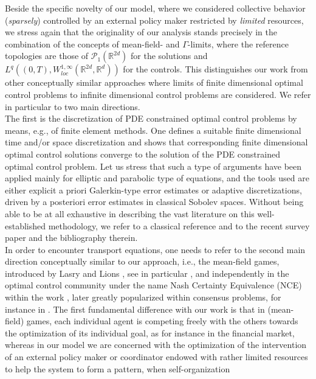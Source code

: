\documentclass[11pt]{article}
\theoremstyle{plain}
\theoremstyle{definition}
\theoremstyle{remark}
\numberwithin{equation}{section}
\begin{document}
Beside the specific novelty of our model, where we considered collective behavior ({\it sparsely}) controlled by an external policy maker restricted by {\it limited} resources, we stress again that the originality  of our analysis stands precisely in the combination of the concepts of mean-field- and $\Gamma$-limits, where the reference topologies
are those of $ \mathcal P_1(\mathbb R^{2d})$ for the solutions and $L^q((0,T),W^{1,\infty}_{loc}(\mathbb R^{2d},\mathbb R^d))$  for the controls. This distinguishes our work from other
conceptually similar approaches where limits of finite dimensional optimal control problems to infinite dimensional control problems are considered.
We refer in particular to two main directions. \\
The first is the discretization of PDE constrained optimal control problems by means, e.g., of finite element methods.
One defines a suitable finite dimensional time and/or space discretization and shows that corresponding finite dimensional optimal control solutions converge to the 
solution of the  PDE constrained optimal control problem. Let us stress that such a type of arguments have been applied mainly for elliptic and
parabolic type of equations, and the tools used are either explicit  a priori Galerkin-type error estimates or adaptive discretizations, driven by a posteriori error 
estimates in classical Sobolev spaces. Without being able to be at all exhaustive in describing the vast literature on this well-established methodology, we refer to a classical reference \cite{glo08} and to the recent survey paper \cite{rave10} and the bibliography therein. \\
In order to encounter  transport equations, one needs to refer to the second main direction conceptually similar
to our approach, i.e., the mean-field games, introduced by Lasry and Lions \cite{lali07}, see in particular \cite[Section 2.6]{lali07}, and independently in the optimal control community under the name
Nash Certainty Equivalence (NCE) within the work \cite{HCM03}, later greatly popularized within consensus problems, 
for instance in \cite{NCM10,NCM11}. The first fundamental difference with our work is that in (mean-field) games, each individual agent is competing freely with
the others towards the optimization of its individual goal, as for instance in the financial market, whereas in our model we are concerned with the optimization of the intervention 
of an external policy maker or coordinator endowed with rather limited resources to help the system to form a pattern, when self-organization
\end{document}
